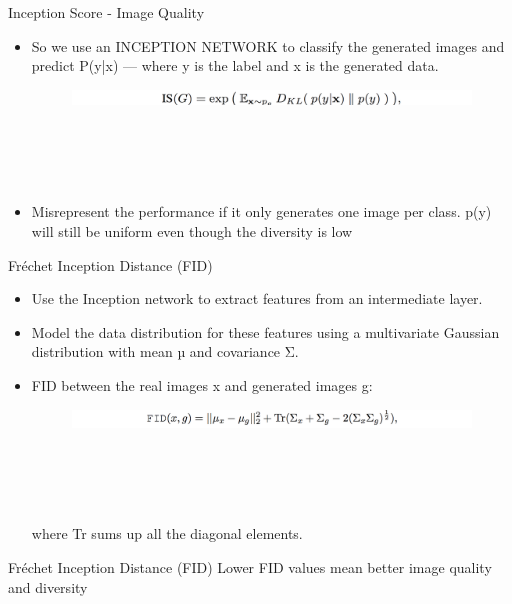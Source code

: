 \documentclass[10pt]{beamer}
\begin{document}
\begin{frame}[fragile]{Inception Score - Image Quality}
    \begin{itemize}

        \item So we use an INCEPTION NETWORK to classify the generated images and predict P(y|x) — where y is the label and x is the generated data.

      \begin{figure}[ht]
         \hspace*{-1cm}\includegraphics[width=0.8\linewidth]{is.png} \\ \\ \\ \\ \\
    \end{figure}
   \item Misrepresent the performance if it only generates one image per class. p(y) will still be uniform even though the diversity is low
    \end{itemize}
\end{frame}

\begin{frame}[fragile]{Fréchet Inception Distance (FID)}
    \begin{itemize}

    \item Use the Inception network to extract features from an intermediate layer.
    \item Model the data distribution for these features using a multivariate Gaussian distribution with mean µ and covariance Σ.
    \item FID between the real images x and generated images g:
         \begin{figure}[ht]
             \hspace*{-1cm}\includegraphics[width=1.0\linewidth]{fid.png} \\ \\ \\ \\ \\
        \end{figure}
        where Tr sums up all the diagonal elements.

    \end{itemize}
\end{frame}
\begin{frame}[fragile]{Fréchet Inception Distance (FID)}
Lower FID values mean better image quality and diversity
\end{frame}
\end{document}
